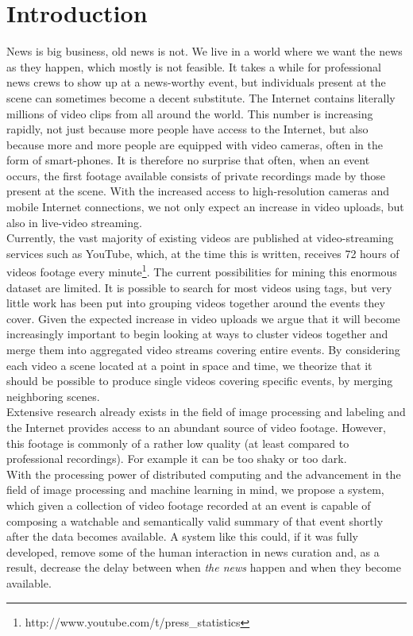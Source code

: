 %
\chapter{Introduction}
%
News is big business, old news is not. We live in a world where we want the news as they happen, which mostly is not feasible. It takes a while for professional news crews to show up at a news-worthy event, but individuals present at the scene can sometimes become a decent substitute. The Internet contains literally millions of video clips from all around the world. This number is increasing rapidly, not just because more people have access to the Internet, but also because more and more people are equipped with video cameras, often in the form of smart-phones. It is therefore no surprise that often, when an event occurs, the first footage available consists of private recordings made by those present at the scene. With the increased access to high-resolution cameras and mobile Internet connections, we not only expect an increase in video uploads, but also in live-video streaming.\\
Currently, the vast majority of existing videos are published at video-streaming services such as YouTube, which, at the time this is written, receives 72 hours of videos footage every minute\footnote{http://www.youtube.com/t/press\_statistics}. The current possibilities for mining this enormous dataset are limited. It is possible to search for most videos using tags, but very little work has been put into grouping videos together around the events they cover. Given the expected increase in video uploads we argue that it will become increasingly important to begin looking at ways to cluster videos together and merge them into aggregated video streams covering entire events. By considering each video a scene located at a point in space and time, we theorize that it should be possible to produce single videos covering specific events, by merging neighboring scenes.\\
Extensive research already exists in the field of image processing and labeling and the Internet provides access to an abundant source of video footage. However, this footage is commonly of a rather low quality (at least compared to professional recordings). For example it can be too shaky or too dark.\\
With the processing power of distributed computing and the advancement in the field of image processing and machine learning in mind, we propose a system, which given a collection of video footage recorded at an event is capable of composing a watchable and semantically valid summary of that event shortly after the data becomes available. A system like this could, if it was fully developed, remove some of the human interaction in news curation and, as a result, decrease the delay between when \textit{the news} happen and when they become available.
%
